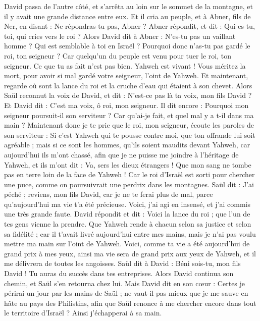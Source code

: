 \begin{multicols}{2}
David passa de l'autre côté, et s'arrêta au loin sur le sommet de la montagne, et il y avait une grande distance entre eux.
Et il cria au peuple, et à Abner, fils de Ner, en disant : Ne répondras-tu pas, Abner ? Abner répondit, et dit : Qui es-tu, toi, qui cries vers le roi ?
Alors David dit à Abner : N'es-tu pas un vaillant homme ? Qui est semblable à toi en Israël ? Pourquoi donc n'as-tu pas gardé le roi, ton seigneur ? Car quelqu'un du peuple est venu pour tuer le roi, ton seigneur.
Ce que tu as fait n'est pas bien. Yahweh est vivant ! Vous méritez la mort, pour avoir si mal gardé votre seigneur, l'oint de Yahweh. Et maintenant, regarde où sont la lance du roi et la cruche d'eau qui étaient à son chevet.
Alors Saül reconnut la voix de David, et dit : N'est-ce pas là ta voix, mon fils David ? Et David dit : C'est ma voix, ô roi, mon seigneur.
Il dit encore : Pourquoi mon seigneur poursuit-il son serviteur ? Car qu'ai-je fait, et quel mal y a t-il dans ma main ?
Maintenant donc je te prie que le roi, mon seigneur, écoute les paroles de son serviteur : Si c'est Yahweh qui te pousse contre moi, que ton offrande lui soit agréable ; mais si ce sont les hommes, qu'ils soient maudits devant Yahweh, car aujourd'hui ils m'ont chassé, afin que je ne puisse me joindre à l'héritage de Yahweh, et ils m'ont dit : Va, sers les dieux étrangers !
Que mon sang ne tombe pas en terre loin de la face de Yahweh ! Car le roi d'Israël est sorti pour chercher une puce, comme on poursuivrait une perdrix dans les montagnes.
Saül dit : J'ai péché ; reviens, mon fils David, car je ne te ferai plus de mal, parce qu'aujourd'hui ma vie t'a été précieuse. Voici, j'ai agi en insensé, et j'ai commis une très grande faute.
David répondit et dit : Voici la lance du roi ; que l'un de tes gens vienne la prendre.
Que Yahweh rende à chacun selon sa justice et selon sa fidélité ; car il t'avait livré aujourd'hui entre mes mains, mais je n'ai pas voulu mettre ma main sur l'oint de Yahweh.
Voici, comme ta vie a été aujourd'hui de grand prix à mes yeux, ainsi ma vie sera de grand prix aux yeux de Yahweh, et il me délivrera de toutes les angoisses.
Saül dit à David : Béni sois-tu, mon fils David ! Tu auras du succès dans tes entreprises. Alors David continua son chemin, et Saül s'en retourna chez lui.
\VerseOne{}Mais David dit en son cœur : Certes je périrai un jour par les mains de Saül ; ne vaut-il pas mieux que je me sauve en hâte au pays des Philistins, afin que Saül renonce à me chercher encore dans tout le territoire d'Israël ? Ainsi j'échapperai à sa main.

\end{multicols}
